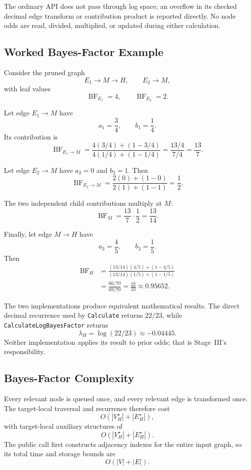 \documentclass[11pt]{article}
\newcommand{\BF}{\operatorname{BF}}
\begin{document}
The ordinary API does not pass through log space; an overflow in its checked
decimal edge transform or contribution product is reported directly.  No node
odds are read, divided, multiplied, or updated during either calculation.

\subsection{Worked Bayes-Factor Example}

Consider the pruned graph
\[
    E_1\longrightarrow M\longrightarrow H,
    \qquad
    E_2\longrightarrow M,
\]
with leaf values
\[
    \BF_{E_1}=4,
    \qquad
    \BF_{E_2}=2.
\]

Let edge \(E_1\to M\) have
\[
    a_1=\frac{3}{4},
    \qquad
    b_1=\frac{1}{4}.
\]
Its contribution is
\[
    \BF_{E_1\rightarrow M}
      =
      \frac{4(3/4)+(1-3/4)}{4(1/4)+(1-1/4)}
      =
      \frac{13/4}{7/4}
      =
      \frac{13}{7}.
\]

Let edge \(E_2\to M\) have \(a_2=0\) and \(b_2=1\).  Then
\[
    \BF_{E_2\rightarrow M}
      =
      \frac{2(0)+(1-0)}{2(1)+(1-1)}
      =\frac{1}{2}.
\]

The two independent child contributions multiply at \(M\):
\[
    \BF_M
      =\frac{13}{7}\cdot\frac{1}{2}
      =\frac{13}{14}.
\]

Finally, let edge \(M\to H\) have
\[
    a_3=\frac{4}{5},
    \qquad
    b_3=\frac{1}{5}.
\]
Then
\begin{align*}
    \BF_H
      &=
      \frac{(13/14)(4/5)+(1-4/5)}
           {(13/14)(1/5)+(1-1/5)}\\[0.4em]
      &=
      \frac{66/70}{69/70}
       =\frac{22}{23}
       \approx 0.95652.
\end{align*}

The two implementations produce equivalent mathematical results.  The direct
decimal recurrence used by \texttt{Calculate} returns \(22/23\), while
\texttt{CalculateLogBayesFactor} returns
\[
    \lambda_H=\log(22/23)\approx -0.04445.
\]
Neither implementation applies its result to prior odds; that is
Stage~III's responsibility.

\subsection{Bayes-Factor Complexity}

Every relevant node is queued once, and every relevant edge is transformed
once.  The target-local traversal and recurrence therefore cost
\[
    O(|V_H^{\star}|+|E_H^{\star}|),
\]
with target-local auxiliary structures of
\[
    O(|V_H^{\star}|+|E_H^{\star}|).
\]
The public call first constructs adjacency indexes for the entire input graph,
so its total time and storage bounds are
\[
    O(|V|+|E|).
\]
\end{document}
